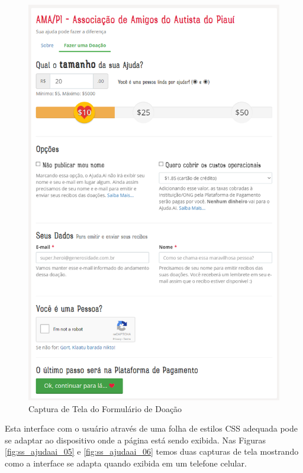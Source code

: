 \begin{figure}[H]
	\caption{\label{fig:ss_ajudaai_04}Captura de Tela do Formulário de Doação}
    \centering
    \includegraphics[scale=0.5]{imagens/screenshot-ajudaai-04.png}
\end{figure}

Esta interface com o usuário através de uma folha de estilos CSS adequada pode se adaptar ao dispositivo onde a página está sendo exibida. Nas Figuras \ref{fig:ss_ajudaai_05} e \ref{fig:ss_ajudaai_06} temos duas capturas de tela mostrando como a interface se adapta quando exibida em um telefone celular.

